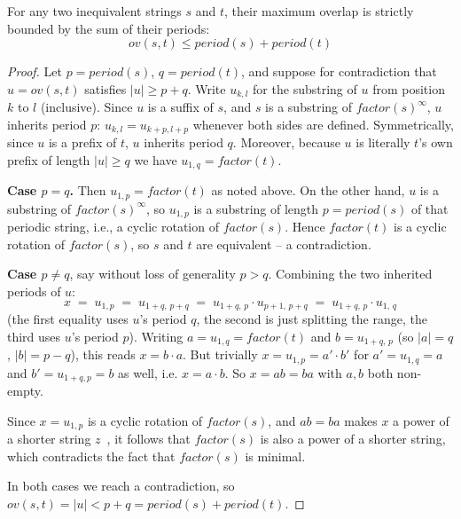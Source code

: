 \begin{lemma} \label{lemma:inequivalent_overlap}
For any two inequivalent strings $s$ and $t$, their maximum overlap is strictly
bounded by the sum of their periods:
\begin{equation}
ov(s, t) \le period(s) + period(t)
\end{equation}
\end{lemma}
\begin{proof}
Let $p = period(s)$, $q = period(t)$, and suppose for contradiction that $u =
ov(s,t)$ satisfies $|u| \ge p+q$. Write $u_{k,l}$ for the substring of $u$ from
position $k$ to $l$ (inclusive). Since $u$ is a suffix of $s$, and $s$ is a
substring of $\textit{factor}(s)^\infty$, $u$ inherits period $p$: $u_{k,l} =
u_{k+p,l+p}$ whenever both sides are defined. Symmetrically, since $u$ is a
prefix of $t$, $u$ inherits period $q$. Moreover, because $u$ is literally $t$'s
own prefix of length $|u| \ge q$ we have $u_{1,q} = \textit{factor}(t)$.

\textbf{Case $p = q$.} Then $u_{1,p} = \textit{factor}(t)$ as noted above. On
the other hand, $u$ is a substring of $\textit{factor}(s)^\infty$, so $u_{1,p}$
is a substring of length $p = \textit{period}(s)$ of that periodic string, i.e.,
a cyclic rotation of $\textit{factor}(s)$. Hence $\textit{factor}(t)$ is a
cyclic rotation of $\textit{factor}(s)$, so $s$ and $t$ are equivalent -- a
contradiction.

\textbf{Case $p \neq q$}, say without loss of generality $p > q$. Combining the
two inherited periods of $u$:
\begin{equation}
x \;=\; u_{1,p} \;=\; u_{1+q,\,p+q} \;=\; u_{1+q,\,p}\cdot u_{p+1,\,p+q} \;=\; u_{1+q,\,p}\cdot u_{1,\,q}
\end{equation}
(the first equality uses $u$'s period $q$, the second is just splitting the
range, the third uses $u$'s period $p$). Writing $a = u_{1,q} =
\textit{factor}(t)$ and $b = u_{1+q,\,p}$ (so $|a|=q$, $|b|=p-q$), this reads $x
= b \cdot a$. But trivially $x = u_{1,p} = a' \cdot b'$ for $a' = u_{1,q} = a$
and $b' = u_{1+q,p} = b$ as well, i.e. $x = a \cdot b$. So $x = ab = ba$ with
$a, b$ both non-empty.

Since $x = u_{1,p}$ is a cyclic rotation of $\textit{factor}(s)$, and $ab=ba$
makes $x$ a power of a shorter string $z$~\cite{lyndon1962equation}, it
follows that $\textit{factor}(s)$
is also a power of a shorter string, which contradicts the fact that
$\textit{factor}(s)$ is minimal.

In both cases we reach a contradiction, so $ov(s,t) = |u| < p + q =
\textit{period}(s) + \textit{period}(t)$.
\end{proof}

